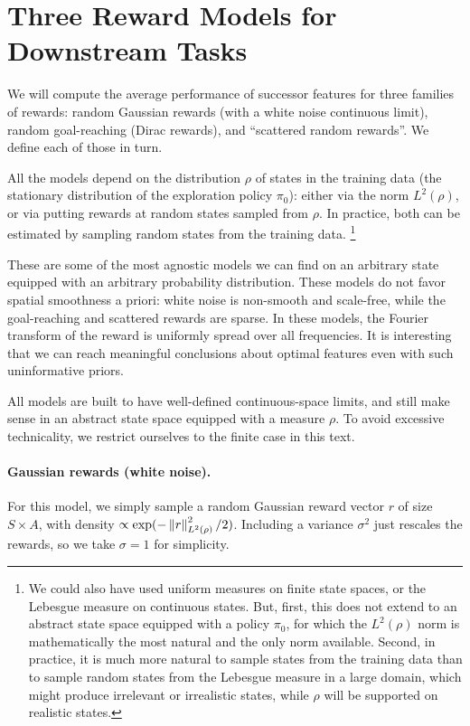 \documentclass[11pt,a4paper]{article}
\begin{document}
\section{Three Reward Models for Downstream Tasks}
\label{sec:rmodels}

We will compute the average performance of successor features for three
families of rewards: random Gaussian rewards (with a white noise
continuous limit), random goal-reaching (Dirac
rewards), and ``scattered random rewards''. We define each of those in
turn.

All the models depend on the distribution $\rho$ of states in the
training data (the stationary distribution of the exploration policy
$\pi_0$): either via the norm $L^2(\rho)$, or via putting rewards at
random states sampled from $\rho$. In practice, both can be estimated by
sampling random states from the
training data. \footnote{We could also have used uniform measures on
finite state spaces, or the Lebesgue measure on continuous states. But, first,
this does not extend to an abstract state space equipped with a policy
$\pi_0$, for which the $L^2(\rho)$ norm is mathematically the most natural
and the only norm available. Second, in practice, it is much more natural
to sample states from the training data than to sample random states from the
Lebesgue measure in a large domain, which might produce irrelevant or
irrealistic states, while $\rho$ will be supported on realistic states.
}

These are some of the most agnostic models we can find on
an arbitrary state equipped with an arbitrary probability distribution.
These models do not favor spatial smoothness a priori: white noise is
non-smooth and scale-free, while the goal-reaching and scattered rewards
are sparse. In these models, the Fourier transform of the reward is
uniformly spread over all frequencies. It is interesting that we can
reach meaningful conclusions about optimal features even with such
uninformative priors.

All models are built to have well-defined continuous-space limits, and
still make sense in an abstract state space equipped with a measure
$\rho$. To avoid excessive technicality, we restrict ourselves to
the finite case in this text.

\paragraph{Gaussian rewards (white noise).} For this model, we simply
sample a random Gaussian reward vector $r$ of size $S\times A$, with density 
$\propto
\exp(-\left\lVert r\right\rVert^2_{L^2(\rho)}/2)$.
Including a variance $\sigma^2$ just rescales the rewards, so we take
$\sigma=1$ for simplicity.
\end{document}
